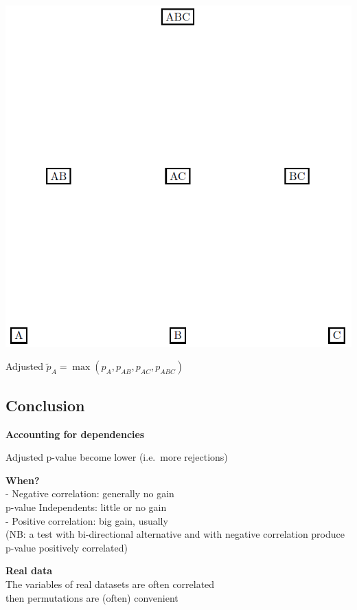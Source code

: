 \documentclass[
]{article}
\begin{document}
\begin{center}\includegraphics[width=9.82in]{./figs/closed_set} \end{center}

Adjusted \(\tilde p_A=\max(p_A,p_{AB},p_{AC},p_{ABC})\)

\hypertarget{conclusion-1}{%
\subsection{Conclusion}\label{conclusion-1}}

\textbf{Accounting for dependencies}

Adjusted p-value become lower (i.e.~more rejections)

\textbf{When?}\\
- Negative correlation: generally no gain\\
p-value Independents: little or no gain\\
- Positive correlation: big gain, usually\\
(NB: a test with bi-directional alternative and with negative
correlation produce p-value positively correlated)

\textbf{Real data}\\
The variables of real datasets are often correlated\\
then permutations are (often) convenient
\end{document}
